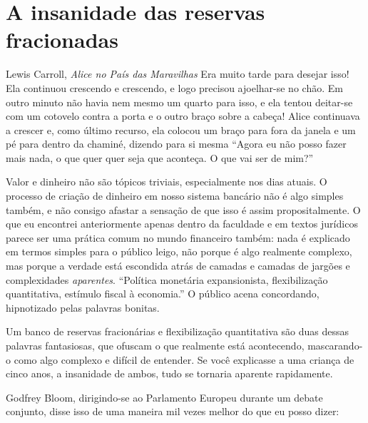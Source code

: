 \chapter{A insanidade das reservas fracionadas}
\label{les:13}

\begin{chapquote}{Lewis Carroll, \textit{Alice no País das Maravilhas}}
Era muito tarde para desejar isso! Ela continuou crescendo e crescendo, e logo precisou ajoelhar-se no chão. Em outro minuto não havia nem mesmo um quarto para isso, e ela tentou deitar-se com um cotovelo contra a porta e o outro braço sobre a cabeça! Alice continuava a crescer e, como último recurso, ela colocou um braço para fora da janela e um pé para dentro da chaminé, dizendo para si mesma 
\enquote{Agora eu não posso fazer mais nada, o que quer quer seja que aconteça. O que vai ser de mim?}
\end{chapquote}

Valor e dinheiro não são tópicos triviais, especialmente nos dias atuais. O processo de criação de dinheiro em nosso sistema bancário não é algo simples também, e não consigo afastar a sensação de que isso é assim propositalmente. O que eu encontrei anteriormente apenas dentro da faculdade e em textos jurídicos parece ser uma prática comum no mundo financeiro também: nada é explicado em termos simples para o público leigo, não porque é algo realmente complexo, mas porque a verdade está escondida atrás de camadas e camadas de jargões e complexidades \textit{aparentes}. \enquote{Política monetária expansionista, flexibilização quantitativa, estímulo fiscal à economia.} O público acena concordando, hipnotizado pelas palavras bonitas.

Um banco de reservas fracionárias e flexibilização quantitativa são duas dessas palavras fantasiosas, que ofuscam o que realmente está acontecendo, mascarando-o como algo complexo e difícil de entender. Se você explicasse a uma criança de cinco anos, a insanidade de ambos, tudo se tornaria aparente rapidamente.

Godfrey Bloom, dirigindo-se ao Parlamento Europeu durante um debate conjunto, disse isso de uma maneira mil vezes melhor do que eu posso dizer:

